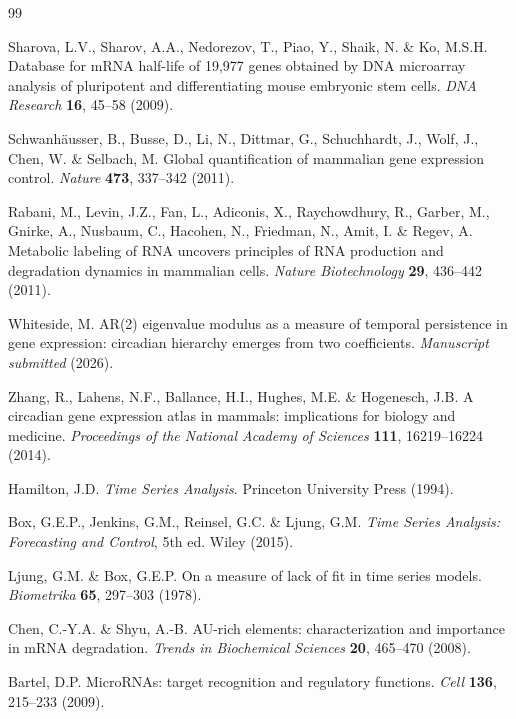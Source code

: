 \documentclass[11pt,letterpaper]{article}
\begin{document}
\begin{thebibliography}{99}

Sharova, L.V., Sharov, A.A., Nedorezov, T., Piao, Y., Shaik, N. \& Ko, M.S.H.
Database for mRNA half-life of 19,977 genes obtained by DNA microarray analysis of pluripotent and differentiating mouse embryonic stem cells.
\textit{DNA Research} \textbf{16}, 45--58 (2009).

Schwanh{\"a}usser, B., Busse, D., Li, N., Dittmar, G., Schuchhardt, J., Wolf, J., Chen, W. \& Selbach, M.
Global quantification of mammalian gene expression control.
\textit{Nature} \textbf{473}, 337--342 (2011).

Rabani, M., Levin, J.Z., Fan, L., Adiconis, X., Raychowdhury, R., Garber, M., Gnirke, A., Nusbaum, C., Hacohen, N., Friedman, N., Amit, I. \& Regev, A.
Metabolic labeling of RNA uncovers principles of RNA production and degradation dynamics in mammalian cells.
\textit{Nature Biotechnology} \textbf{29}, 436--442 (2011).

Whiteside, M.
AR(2) eigenvalue modulus as a measure of temporal persistence in gene expression: circadian hierarchy emerges from two coefficients.
\textit{Manuscript submitted} (2026).

Zhang, R., Lahens, N.F., Ballance, H.I., Hughes, M.E. \& Hogenesch, J.B.
A circadian gene expression atlas in mammals: implications for biology and medicine.
\textit{Proceedings of the National Academy of Sciences} \textbf{111}, 16219--16224 (2014).

Hamilton, J.D.
\textit{Time Series Analysis}.
Princeton University Press (1994).

Box, G.E.P., Jenkins, G.M., Reinsel, G.C. \& Ljung, G.M.
\textit{Time Series Analysis: Forecasting and Control}, 5th ed.
Wiley (2015).

Ljung, G.M. \& Box, G.E.P.
On a measure of lack of fit in time series models.
\textit{Biometrika} \textbf{65}, 297--303 (1978).

Chen, C.-Y.A. \& Shyu, A.-B.
AU-rich elements: characterization and importance in mRNA degradation.
\textit{Trends in Biochemical Sciences} \textbf{20}, 465--470 (2008).

Bartel, D.P.
MicroRNAs: target recognition and regulatory functions.
\textit{Cell} \textbf{136}, 215--233 (2009).


\end{thebibliography}
\end{document}
